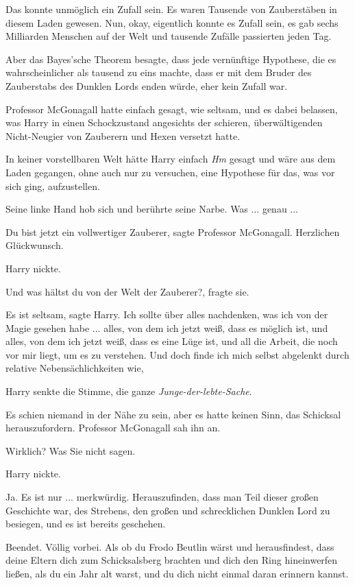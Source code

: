 Das konnte unmöglich ein Zufall sein. Es waren Tausende von Zauberstäben in
diesem Laden gewesen. Nun, okay, eigentlich konnte es Zufall sein, es gab sechs
Milliarden Menschen auf der Welt und tausende Zufälle passierten jeden Tag.

Aber das Bayes'sche Theorem besagte, dass jede vernünftige Hypothese, die es
wahrscheinlicher als tausend zu eins machte, dass er mit dem Bruder des
Zauberstabs des Dunklen Lords enden würde, eher kein Zufall war.

Professor McGonagall hatte einfach gesagt, wie seltsam, und es dabei belassen,
was Harry in einen Schockzustand angesichts der schieren, überwältigenden
Nicht-Neugier von Zauberern und Hexen versetzt hatte.

In keiner vorstellbaren Welt hätte Harry einfach \glqq{}\emph{Hm}\grqq{} gesagt
und wäre aus dem Laden gegangen, ohne auch nur zu versuchen, eine Hypothese für
das, was vor sich ging, aufzustellen.

Seine linke Hand hob sich und berührte seine Narbe. Was ... genau ...

\glqq{}Du bist jetzt ein vollwertiger Zauberer\grqq{}, sagte Professor
McGonagall. \glqq{}Herzlichen Glückwunsch.\grqq{}

Harry nickte.

\glqq{}Und was hältst du von der Welt der Zauberer?\grqq{}, fragte sie.

\glqq{}Es ist seltsam\grqq{}, sagte Harry. \glqq{}Ich sollte über alles
nachdenken, was ich von der Magie gesehen habe ... alles, von dem ich jetzt
weiß, dass es möglich ist, und alles, von dem ich jetzt weiß, dass es eine Lüge
ist, und all die Arbeit, die noch vor mir liegt, um es zu verstehen. Und doch
finde ich mich selbst abgelenkt durch relative Nebensächlichkeiten wie\grqq{},

Harry senkte die Stimme, \glqq{}die ganze \emph{Junge-der-lebte-Sache}.\grqq{}

Es schien niemand in der Nähe zu sein, aber es hatte keinen Sinn, das Schicksal
herauszufordern. Professor McGonagall sah ihn an.

\glqq{}Wirklich? Was Sie nicht sagen.\grqq{}

Harry nickte.

\glqq{}Ja. Es ist nur ... merkwürdig. Herauszufinden, dass man Teil dieser großen
Geschichte war, des Strebens, den großen und schrecklichen Dunklen Lord zu
besiegen, und es ist bereits geschehen.

Beendet. Völlig vorbei. Als ob du Frodo Beutlin wärst und herausfindest, dass
deine Eltern dich zum Schicksalsberg brachten und dich den Ring hineinwerfen
ließen, als du ein Jahr alt warst, und du dich nicht einmal daran erinnern
kannst.\grqq{}

